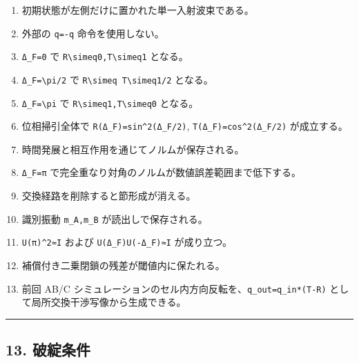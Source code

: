 \documentclass[
  a4paper,
]{article}
\providecommand{\tightlist}{%
  \setlength{\itemsep}{0pt}\setlength{\parskip}{0pt}}
\begin{document}
\begin{enumerate}
\def\labelenumi{\arabic{enumi}.}
\tightlist
\item
  初期状態が左側だけに置かれた単一入射波束である。
\item
  外部の \texttt{q=-q} 命令を使用しない。
\item
  \texttt{Δ\_F=0} で
  \texttt{R\textbackslash{}simeq0,T\textbackslash{}simeq1} となる。
\item
  \texttt{Δ\_F=\textbackslash{}pi/2} で
  \texttt{R\textbackslash{}simeq\ T\textbackslash{}simeq1/2} となる。
\item
  \texttt{Δ\_F=\textbackslash{}pi} で
  \texttt{R\textbackslash{}simeq1,T\textbackslash{}simeq0} となる。
\item
  位相掃引全体で \texttt{R(Δ\_F)=sin\^{}2(Δ\_F/2)},
  \texttt{T(Δ\_F)=cos\^{}2(Δ\_F/2)} が成立する。
\item
  時間発展と相互作用を通じてノルムが保存される。
\item
  \texttt{Δ\_F=π} で完全重なり対角のノルムが数値誤差範囲まで低下する。
\item
  交換経路を削除すると節形成が消える。
\item
  識別振動 \texttt{m\_A,m\_B} が読出しで保存される。
\item
  \texttt{U(π)\^{}2≈I} および \texttt{U(Δ\_F)U(-Δ\_F)≈I} が成り立つ。
\item
  補償付き二乗閉鎖の残差が閾値内に保たれる。
\item
  前回 AB/C
  シミュレーションのセル内方向反転を、\texttt{q\_out=q\_in*(T-R)}
  として局所交換干渉写像から生成できる。
\end{enumerate}

\begin{center}\rule{0.5\linewidth}{0.5pt}\end{center}

\subsection{13. 破綻条件}\label{ux7834ux7dbbux6761ux4ef6}
\end{document}

